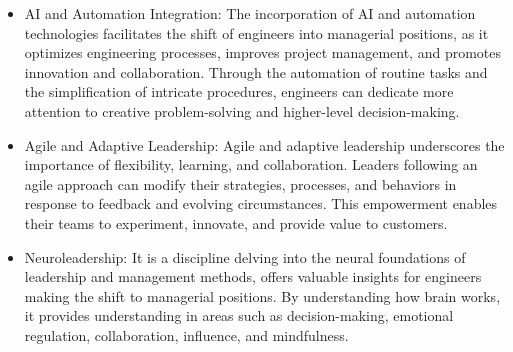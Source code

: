 \documentclass[runningheads]{article}
\begin{document}
\begin{itemize}
    \item AI and Automation Integration: The incorporation of AI and automation technologies facilitates the shift of engineers into managerial positions, as it optimizes engineering processes, improves project management, and promotes innovation and collaboration. Through the automation of routine tasks and the simplification of intricate procedures, engineers can dedicate more attention to creative problem-solving and higher-level decision-making.

    \item Agile and Adaptive Leadership: Agile and adaptive leadership underscores the importance of flexibility, learning, and collaboration. Leaders following an agile approach can modify their strategies, processes, and behaviors in response to feedback and evolving circumstances. This empowerment enables their teams to experiment, innovate, and provide value to customers.

    \item Neuroleadership: It is a discipline delving into the neural foundations of leadership and management methods, offers valuable insights for engineers making the shift to managerial positions. By understanding how brain works, it provides understanding in areas such as decision-making, emotional regulation, collaboration, influence, and mindfulness.
    
\end{itemize}



\end{document}

